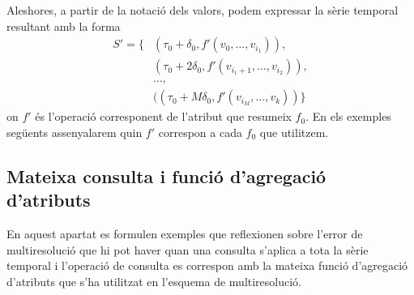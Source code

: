 \begin{definition}
  Aleshores, a partir de la notació dels valors, podem expressar la
  sèrie temporal resultant amb la forma
  \begin{align*}
    S'=\{& (\tau_0+\delta_0, f'(v_0,\dotsc,v_{i_1})),\\
    & (\tau_0+2\delta_0, f'(v_{i_1+1},\dotsc,v_{i_2})),\\
    & \dotsc,\\
    & ((\tau_0+M\delta_0 ,f'(v_{i_M},\dotsc, v_k)) \}
  \end{align*}
  on $f'$ és l'operació corresponent de l'atribut que resumeix
  $f_0$. En els exemples següents assenyalarem quin $f'$ correspon a
  cada $f_0$ que utilitzem.
\end{definition}






\subsection{Mateixa consulta i funció d'agregació d'atributs}
\label{ex:multiresolucio:f=op}


En aquest apartat es formulen exemples que reflexionen sobre l'error
de multiresolució que hi pot haver quan una consulta s'aplica a tota
la sèrie temporal i l'operació de consulta es correspon amb la mateixa
funció d'agregació d'atributs que s'ha utilitzat en l'esquema de
multiresolució.




